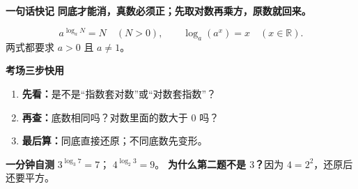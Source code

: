 \clearpage
\begin{summarybox}
	\textbf{\textcolor{CSummary}{一句话快记}}
	\textbf{同底才能消，真数必须正；先取对数再乘方，原数就回来。}

	\[
	\boxed{a^{\log_a N}=N}\quad(N>0),
	\qquad
	\boxed{\log_a(a^x)=x}\quad(x\in\mathbb{R}).
	\]
	两式都要求 $a>0$ 且 $a\neq 1$。

	\medskip
	\textbf{\textcolor{CSummary}{考场三步快用}}
	\begin{enumerate}[leftmargin=*, itemsep=0.3em, topsep=0.3em]
		\item \textbf{先看：}是不是“指数套对数”或“对数套指数”？
		\item \textbf{再查：}底数相同吗？对数里面的数大于 $0$ 吗？
		\item \textbf{最后算：}同底直接还原；不同底数先变形。
	\end{enumerate}

	\textbf{\textcolor{CSummary}{一分钟自测}}
	$3^{\log_3 7}=\boxed{7}$；
	$4^{\log_2 3}=\boxed{9}$。
	\textbf{为什么第二题不是 $3$？}因为 $4=2^2$，还原后还要平方。
\end{summarybox}

